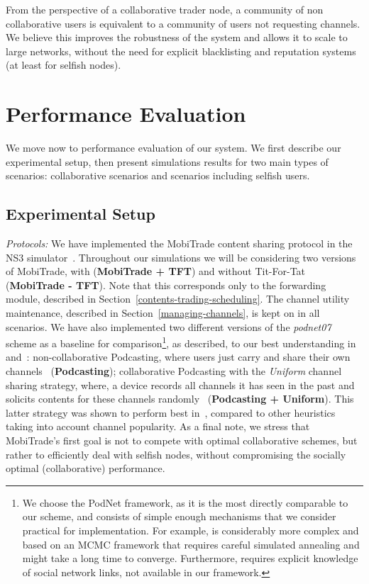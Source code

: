 From the perspective of a collaborative trader node, a community of non collaborative users is equivalent to a community of users not requesting channels. We believe this improves the robustness of the system and allows it to scale to large networks, without the need for explicit blacklisting and reputation systems (at least for selfish nodes).

\section{Performance Evaluation}
\label{performance-evaluation}

We move now to performance evaluation of our system. We first describe our experimental setup, then present simulations results for two main types of scenarios: collaborative scenarios and scenarios including selfish users.

\subsection{Experimental Setup}
\label{experimental-setup}

\emph{Protocols:} We have implemented the MobiTrade content sharing protocol in the NS3 simulator~\cite{NS3}. Throughout our simulations we will be considering two versions of MobiTrade, with (\textbf{MobiTrade + TFT}) and without Tit-For-Tat (\textbf{MobiTrade - TFT}). Note that this corresponds only to the forwarding module, described in Section~\ref{contents-trading-scheduling}. The channel utility maintenance, described in Section~\ref{managing-channels}, is kept on in all scenarios. We have also implemented two different versions of the \emph{podnet07} scheme as a baseline for comparison\footnote{We choose the PodNet framework, as it is the most directly comparable to our scheme, and consists of simple enough mechanisms that we consider practical for implementation. For example, \cite{OptimalChannelChoice} is considerably more complex and based on an MCMC framework that requires careful simulated annealing and might take a long time to converge. Furthermore, \cite{ContentPlace} requires explicit knowledge of social network links, not available in our framework.},  as described, to our best understanding in~\cite{May07wirelessopportunistic} and~\cite{Podcasting:Secon07}: non-collaborative Podcasting, where users just carry and share their own channels~\cite{May07wirelessopportunistic} (\textbf{Podcasting}); collaborative Podcasting with the \emph{Uniform} channel sharing strategy, where, a device records all channels it has seen in the past and solicits contents for these channels randomly~\cite{Podcasting:Secon07} (\textbf{Podcasting + Uniform}). This latter strategy was shown to perform best in~\cite{Podcasting:Secon07}, compared to other heuristics taking into account channel popularity. As a final note, we stress that MobiTrade's first goal is not to compete with optimal collaborative schemes, but rather to efficiently deal with selfish nodes, without compromising the socially optimal (collaborative) performance.

